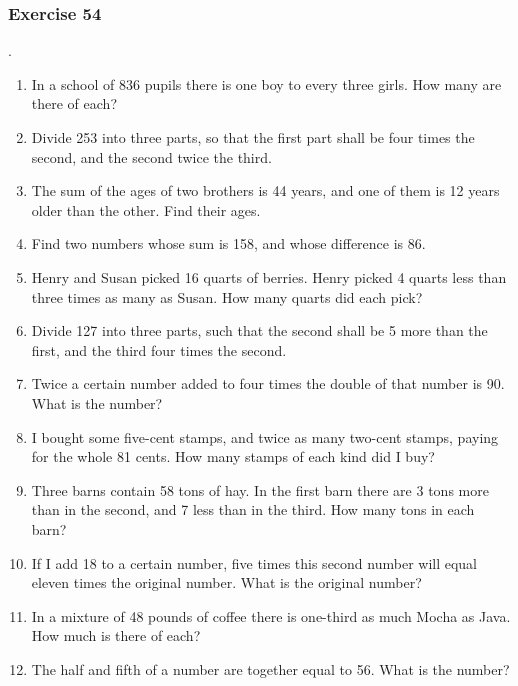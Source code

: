 \documentclass{book}
\begin{document}
\subsubsection*{Exercise 54}.
\begin{enumerate}
\item In a school of 836 pupils there is one boy to every
three girls. How many are there of each?

\item Divide 253 into three parts, so that the first part shall
be four times the second, and the second twice the third.

\item The sum of the ages of two brothers is 44 years, and
one of them is 12 years older than the other. Find their
ages.

\item Find two numbers whose sum is 158, and whose difference
is 86.

\item Henry and Susan picked 16 quarts of berries.
Henry picked 4 quarts less than three times as many as
Susan. How many quarts did each pick?

\item Divide 127 into three parts, such that the second
shall be 5 more than the first, and the third four times
the second.

\item Twice a certain number added to four times the
double of that number is 90. What is the number?

\item I bought some five-cent stamps, and twice as many
two-cent stamps, paying for the whole 81 cents. How
many stamps of each kind did I buy?

\item Three barns contain 58 tons of hay. In the first
barn there are 3 tons more than in the second, and 7 less
than in the third. How many tons in each barn?

\item If I add 18 to a certain number, five times this
second number will equal eleven times the original number.
What is the original number?

\item In a mixture of 48 pounds of coffee there is one-third
as much Mocha as Java. How much is there of
each?

\item The half and fifth of a number are together equal to
56. What is the number?


\end{enumerate}
\end{document}
